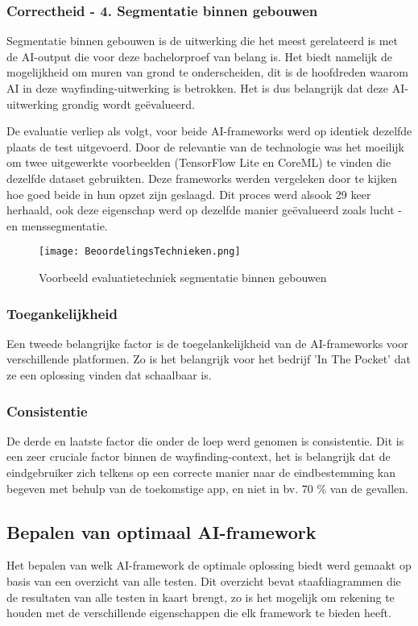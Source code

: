 \subsubsection{Correctheid - 4. Segmentatie binnen gebouwen}
Segmentatie binnen gebouwen is de uitwerking die het meest gerelateerd is met de AI-output die voor deze bachelorproef van belang is. Het biedt namelijk de mogelijkheid om muren van grond te onderscheiden, dit is de hoofdreden waarom AI in deze wayfinding-uitwerking is betrokken. Het is dus belangrijk dat deze AI-uitwerking grondig wordt geëvalueerd.

De evaluatie verliep als volgt, voor beide AI-frameworks werd op identiek dezelfde plaats de test uitgevoerd. Door de relevantie van de technologie was het moeilijk om twee uitgewerkte voorbeelden (TensorFlow Lite en CoreML) te vinden die dezelfde dataset gebruikten. Deze frameworks werden vergeleken door te kijken hoe goed beide in hun opzet zijn geslaagd. Dit proces werd alsook 29 keer herhaald, ook deze eigenschap werd op dezelfde manier geëvalueerd zoals lucht -en menssegmentatie.
\begin{figure}[H]
	\centering
	\texttt{[image: BeoordelingsTechnieken.png]}
	\caption{Voorbeeld evaluatietechniek segmentatie binnen gebouwen}
\end{figure}

\subsubsection{Toegankelijkheid}
Een tweede belangrijke factor is de toegelankelijkheid van de AI-frameworks voor verschillende platformen. Zo is het belangrijk voor het bedrijf 'In The Pocket' dat ze een oplossing vinden dat schaalbaar is.

\subsubsection{Consistentie}
De derde en laatste factor die onder de loep werd genomen is consistentie. Dit is een zeer cruciale factor binnen de wayfinding-context, het is belangrijk dat de eindgebruiker zich telkens op een correcte manier naar de eindbestemming kan begeven met behulp van de toekomstige app, en niet in bv. 70 \% van de gevallen.

\subsection{Bepalen van optimaal AI-framework}
Het bepalen van welk AI-framework de optimale oplossing biedt werd gemaakt op basis van een overzicht van alle testen. Dit overzicht bevat staafdiagrammen die de resultaten van alle testen in kaart brengt, zo is het mogelijk om rekening te houden met de verschillende eigenschappen die elk framework te bieden heeft.

